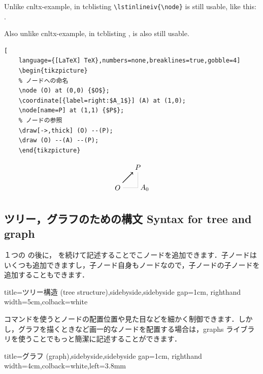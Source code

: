 \documentclass[../geometrymemo.tex]{subfiles}
\begin{document}
Unlike cnltx-example, in tcblisting \verb|\lstinlineiv{\node}| is still usable, like this: \lstinlineiv{\node}.

Also unlike cnltx-example, in tcblisting  %
, is also still usable.

\begin{lstlisting}[
    language={[LaTeX] TeX},numbers=none,breaklines=true,gobble=4]
    \begin{tikzpicture}
    % ノードへの命名
    \node (O) at (0,0) {$O$};
    \coordinate[{label=right:$A_1$}] (A) at (1,0);
    \node[name=P] at (1,1) {$P$};
    % ノードの参照
    \draw[->,thick] (O) --(P);
    \draw (O) --(A) --(P);
    \end{tikzpicture}
\end{lstlisting}
\[
    \begin{tikzpicture}
    \node (O) at (0,0) {$O$};
    \coordinate[{label=right:$A_0$}] (A) at (1,0);
    \node[name=P] at (1,1) {$P$};
    \draw[->,thick] (O) --(P);
    \draw[help lines] (O) --(A) --(P);
    \end{tikzpicture}
\]

\subsection{ツリー，グラフのための構文 Syntax for tree and graph}

１つの  の後に，  を続けて記述することでこノードを追加できます．子ノードはいくつも追加できますし，子ノード自身もノードなので，子ノードの子ノードを追加することもできます．
\begin{tcblisting}{title=ツリー構造 (tree structure),sidebyside,sidebyside gap=1cm,
        righthand width=5cm,colback=white}
\end{tcblisting}

 コマンドを使うとノードの配置位置や見た目などを細かく制御できます．しかし，グラフを描くときなど画一的なノードを配置する場合は，graphs ライブラリを使うことでもっと簡潔に記述することができます．
\begin{tcblisting}{title=グラフ (graph),sidebyside,sidebyside gap=1cm,
        righthand width=4cm,colback=white,left=3.8mm}
\end{tcblisting}
\end{document}
